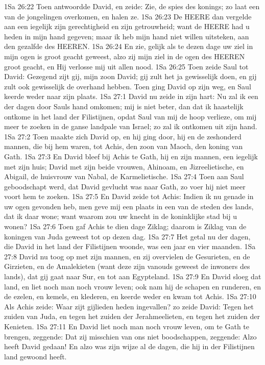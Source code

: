 1Sa 26:22  Toen antwoordde David, en zeide: Zie, de spies des konings; zo laat een van de jongelingen overkomen, en halen ze.
1Sa 26:23  De HEERE dan vergelde aan een iegelijk zijn gerechtigheid en zijn getrouwheid; want de HEERE had u heden in mijn hand gegeven; maar ik heb mijn hand niet willen uitsteken, aan den gezalfde des HEEREN.
1Sa 26:24  En zie, gelijk als te dezen dage uw ziel in mijn ogen is groot geacht geweest, alzo zij mijn ziel in de ogen des HEEREN groot geacht, en Hij verlosse mij uit allen nood.
1Sa 26:25  Toen zeide Saul tot David: Gezegend zijt gij, mijn zoon David; gij zult het ja gewisselijk doen, en gij zult ook gewisselijk de overhand hebben. Toen ging David op zijn weg, en Saul keerde weder naar zijn plaats.
1Sa 27:1  David nu zeide in zijn hart: Nu zal ik een der dagen door Sauls hand omkomen; mij is niet beter, dan dat ik haastelijk ontkome in het land der Filistijnen, opdat Saul van mij de hoop verlieze, om mij meer te zoeken in de ganse landpale van Israel; zo zal ik ontkomen uit zijn hand.
1Sa 27:2  Toen maakte zich David op, en hij ging door, hij en de zeshonderd mannen, die bij hem waren, tot Achis, den zoon van Maoch, den koning van Gath.
1Sa 27:3  En David bleef bij Achis te Gath, hij en zijn mannen, een iegelijk met zijn huis; David met zijn beide vrouwen, Ahinoam, en Jizreelietische, en Abigail, de huisvrouw van Nabal, de Karmelietische.
1Sa 27:4  Toen aan Saul geboodschapt werd, dat David gevlucht was naar Gath, zo voer hij niet meer voort hem te zoeken.
1Sa 27:5  En David zeide tot Achis: Indien ik nu genade in uw ogen gevonden heb, men geve mij een plaats in een van de steden des lands, dat ik daar wone; want waarom zou uw knecht in de koninklijke stad bij u wonen?
1Sa 27:6  Toen gaf Achis te dien dage Ziklag; daarom is Ziklag van de koningen van Juda geweest tot op dezen dag.
1Sa 27:7  Het getal nu der dagen, die David in het land der Filistijnen woonde, was een jaar en vier maanden.
1Sa 27:8  David nu toog op met zijn mannen, en zij overvielen de Gesurieten, en de Girzieten, en de Amalekieten (want deze zijn vanouds geweest de inwoners des lands), dat gij gaat naar Sur, en tot aan Egypteland.
1Sa 27:9  En David sloeg dat land, en liet noch man noch vrouw leven; ook nam hij de schapen en runderen, en de ezelen, en kemels, en klederen, en keerde weder en kwam tot Achis.
1Sa 27:10  Als Achis zeide: Waar zijt gijlieden heden ingevallen? zo zeide David: Tegen het zuiden van Juda, en tegen het zuiden der Jerahmeelieten, en tegen het zuiden der Kenieten.
1Sa 27:11  En David liet noch man noch vrouw leven, om te Gath te brengen, zeggende: Dat zij misschien van ons niet boodschappen, zeggende: Alzo heeft David gedaan! En alzo was zijn wijze al de dagen, die hij in der Filistijnen land gewoond heeft.
